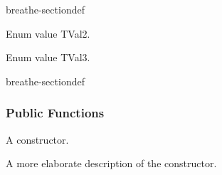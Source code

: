\documentclass[letterpaper,10pt,english]{sphinxmanual}
\begin{document}
\begin{fulllineitems}
\begin{sphinxuseclass}{breathe-sectiondef}
\begin{fulllineitems}
\begin{fulllineitems}
\label{\detokenize{api/classQTstyle__Test:_CPPv4N12QTstyle_Test5TEnum5TVal2E}}
\pysigstartsignatures
\pysigstartmultiline
{}
\pysigstopmultiline
\pysigstopsignatures
\sphinxAtStartPar
Enum value TVal2. 

\end{fulllineitems}


\begin{fulllineitems}
\label{\detokenize{api/classQTstyle__Test:_CPPv4N12QTstyle_Test5TEnum5TVal3E}}
\pysigstartsignatures
\pysigstartmultiline
{}
\pysigstopmultiline
\pysigstopsignatures
\sphinxAtStartPar
Enum value TVal3. 

\end{fulllineitems}


\end{fulllineitems}


\end{sphinxuseclass}
\begin{sphinxuseclass}{breathe-sectiondef}\subsubsection*{Public Functions}

\begin{fulllineitems}
\label{\detokenize{api/classQTstyle__Test:_CPPv4N12QTstyle_Test12QTstyle_TestEv}}
\pysigstartsignatures
\pysigstartmultiline
{}
\pysigstopmultiline
\pysigstopsignatures
\sphinxAtStartPar
A constructor. 

\sphinxAtStartPar
A more elaborate description of the constructor. 


\end{fulllineitems}
\end{sphinxuseclass}
\end{fulllineitems}
\end{document}
